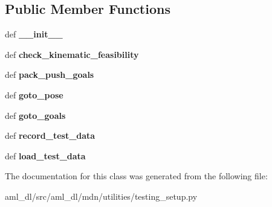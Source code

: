 \subsection*{Public Member Functions}
\begin{DoxyCompactItemize}
\item 
\hypertarget{classsrc_1_1aml__dl_1_1mdn_1_1utilities_1_1testing__setup_1_1_test_setup_ae619f4484ba8aed8756030f43bd07405}{def {\bfseries \-\_\-\-\_\-init\-\_\-\-\_\-}}\label{classsrc_1_1aml__dl_1_1mdn_1_1utilities_1_1testing__setup_1_1_test_setup_ae619f4484ba8aed8756030f43bd07405}

\item 
\hypertarget{classsrc_1_1aml__dl_1_1mdn_1_1utilities_1_1testing__setup_1_1_test_setup_ae32963f2b3b222b906ea5a8a495d57f3}{def {\bfseries check\-\_\-kinematic\-\_\-feasibility}}\label{classsrc_1_1aml__dl_1_1mdn_1_1utilities_1_1testing__setup_1_1_test_setup_ae32963f2b3b222b906ea5a8a495d57f3}

\item 
\hypertarget{classsrc_1_1aml__dl_1_1mdn_1_1utilities_1_1testing__setup_1_1_test_setup_ab0c18627d4158498d406f5ad3971992d}{def {\bfseries pack\-\_\-push\-\_\-goals}}\label{classsrc_1_1aml__dl_1_1mdn_1_1utilities_1_1testing__setup_1_1_test_setup_ab0c18627d4158498d406f5ad3971992d}

\item 
\hypertarget{classsrc_1_1aml__dl_1_1mdn_1_1utilities_1_1testing__setup_1_1_test_setup_a416f7ce4b869e7f256be7d3048f2f9e6}{def {\bfseries goto\-\_\-pose}}\label{classsrc_1_1aml__dl_1_1mdn_1_1utilities_1_1testing__setup_1_1_test_setup_a416f7ce4b869e7f256be7d3048f2f9e6}

\item 
\hypertarget{classsrc_1_1aml__dl_1_1mdn_1_1utilities_1_1testing__setup_1_1_test_setup_a7d673bbb122a0603e925521c73c5df13}{def {\bfseries goto\-\_\-goals}}\label{classsrc_1_1aml__dl_1_1mdn_1_1utilities_1_1testing__setup_1_1_test_setup_a7d673bbb122a0603e925521c73c5df13}

\item 
\hypertarget{classsrc_1_1aml__dl_1_1mdn_1_1utilities_1_1testing__setup_1_1_test_setup_a0efb1b000eee11c3418dfd228509c975}{def {\bfseries record\-\_\-test\-\_\-data}}\label{classsrc_1_1aml__dl_1_1mdn_1_1utilities_1_1testing__setup_1_1_test_setup_a0efb1b000eee11c3418dfd228509c975}

\item 
\hypertarget{classsrc_1_1aml__dl_1_1mdn_1_1utilities_1_1testing__setup_1_1_test_setup_aef8fbeeb36cb7f4687a86321b852d877}{def {\bfseries load\-\_\-test\-\_\-data}}\label{classsrc_1_1aml__dl_1_1mdn_1_1utilities_1_1testing__setup_1_1_test_setup_aef8fbeeb36cb7f4687a86321b852d877}

\end{DoxyCompactItemize}


The documentation for this class was generated from the following file\-:\begin{DoxyCompactItemize}
\item 
aml\-\_\-dl/src/aml\-\_\-dl/mdn/utilities/testing\-\_\-setup.\-py\end{DoxyCompactItemize}
